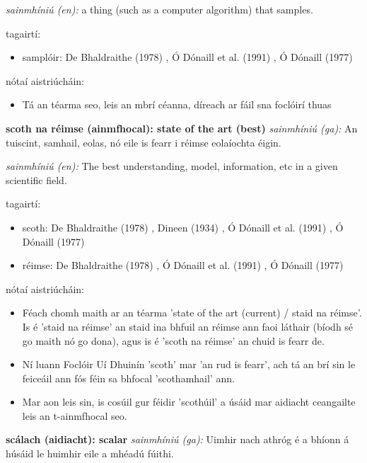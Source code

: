 \documentclass{article}
\begin{document}
\textit{sainmhíniú (en):} a thing (such as a computer algorithm) that samples.

tagairtí:
\begin{itemize}
	\item samplóir: De Bhaldraithe (1978) \cite{de-bhaldraithe}, Ó Dónaill et al. (1991) \cite{focloir-beag}, Ó Dónaill (1977) \cite{odonaill}
\end{itemize}

nótaí aistriúcháin:
\begin{itemize}
	\item Tá an téarma seo, leis an mbrí céanna, díreach ar fáil sna foclóirí thuas
\end{itemize}


\textbf{scoth na réimse (ainmfhocal): state of the art (best)}
\textit{sainmhíniú (ga):} An tuiscint, samhail, eolas, nó eile is fearr i réimse eolaíochta éigin.

\textit{sainmhíniú (en):} The best understanding, model, information, etc in a given scientific field.

tagairtí:
\begin{itemize}
	\item scoth: De Bhaldraithe (1978) \cite{de-bhaldraithe}, Dineen (1934) \cite{dineen}, Ó Dónaill et al. (1991) \cite{focloir-beag}, Ó Dónaill (1977) \cite{odonaill}
	\item réimse: De Bhaldraithe (1978) \cite{de-bhaldraithe}, Ó Dónaill et al. (1991) \cite{focloir-beag}, Ó Dónaill (1977) \cite{odonaill}
\end{itemize}

nótaí aistriúcháin:
\begin{itemize}
	\item Féach chomh maith ar an téarma 'state of the art (current) / staid na réimse'. Is é 'staid na réimse' an staid ina bhfuil an réimse ann faoi láthair (bíodh sé go maith nó go dona), agus is é 'scoth na réimse' an chuid is fearr de.
	\item Ní luann Foclóir Uí Dhuinín 'scoth' mar 'an rud is fearr', ach tá an brí sin le feiceáil ann fós féin sa bhfocal 'scothamhail' ann.
	\item Mar aon leis sin, is cosúil gur féidir 'scothúil' a úsáid mar aidiacht ceangailte leis an t-ainmfhocal seo.
\end{itemize}


\textbf{scálach (aidiacht): scalar}
\textit{sainmhíniú (ga):} Uimhir nach athróg é a bhíonn á húsáid le huimhir eile a mhéadú fúithi.
\end{document}
